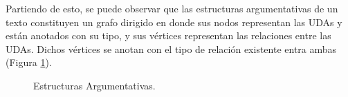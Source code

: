 Partiendo de esto, se puede observar que las estructuras argumentativas de un texto constituyen un grafo dirigido 
en donde sus nodos representan las UDAs y están anotados con su tipo, y sus vértices representan las 
relaciones entre las UDAs. Dichos vértices se anotan con el tipo de relación existente entra ambas 
(Figura \ref{fig:arg_struct}).

\begin{figure}[h!]
	\begin{center}
		\begin{center}
            
        \end{center}
	    \caption{Estructuras Argumentativas.}
        \label{fig:arg_struct}
	\end{center}
\end{figure}
